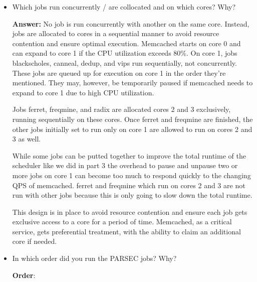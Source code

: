 \begin{enumerate}
\begin{itemize}
\begin{itemize}
        \item {}: Radix follows a similar policy to freqmine, and ferret, with two threads assigned due to its allocation on two cores (core 2 and 3).
        
        \item {}: Vips is also allocated a single core (core 1) and thus uses one thread. Similar to blackscholes, canneal, and dedup, multiple threads would not improve performance significantly and might increase overhead due to context switching.
    \end{itemize}
      
    \item Which jobs run concurrently / are collocated and on which cores? Why?

    \textbf{Answer:} No job is run concurrently with another on the same core. Instead, jobs are allocated to cores in a sequential manner to avoid resource contention and ensure optimal execution. Memcached starts on core 0 and can expand to core 1 if the CPU utilization exceeds 80\%. On core 1, jobs blackscholes, canneal, dedup, and vips run sequentially, not concurrently. These jobs are queued up for execution on core 1 in the order they're mentioned. They may, however, be temporarily paused if memcached needs to expand to core 1 due to high CPU utilization.

     Jobs ferret, freqmine, and radix are allocated cores 2 and 3 exclusively, running sequentially on these cores. Once ferret and freqmine are finished, the other jobs initially set to run only on core 1 are allowed to run on cores 2 and 3 as well.

     While some jobs can be putted together to improve the total runtime of the scheduler like we did in part 3 the overhead to pause and unpause two or more jobs on core 1 can become too much to respond quickly to the changing QPS of memcached. ferret and freqmine which run on cores 2 and 3 are not run with other jobs because this is only going to slow down the total runtime.
     
     This design is in place to avoid resource contention and ensure each job gets exclusive access to a core for a period of time. Memcached, as a critical service, gets preferential treatment, with the ability to claim an additional core if needed.
    
    \item In which order did you run the PARSEC jobs? Why?

    \textbf{Order}: %


\end{itemize}
\end{enumerate}
